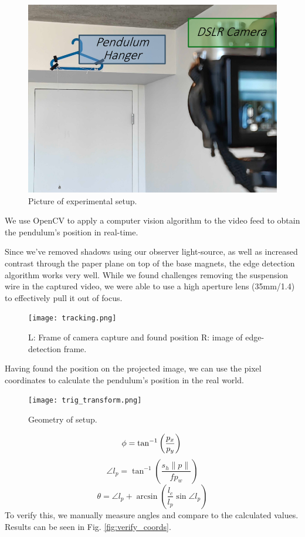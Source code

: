 \documentclass[prl,twocolumn,amsmath,amssymb,superscriptaddress]{revtex4-2}
\begin{document}
\begin{figure}[htb]
    \includegraphics[width=0.66\linewidth]{setup.png}
    \caption{Picture of experimental setup.}
    \label{fig:experiment_setup}
\end{figure}

We use OpenCV to apply a computer vision algorithm to the video feed to obtain the pendulum's position in real-time.

Since we've removed shadows using our observer light-source, as well as increased contrast through the paper plane on top of the base magnets, the edge detection algorithm works very well. While we found challenges removing the suspension wire in the captured video, we were able to use a high aperture lens (35mm/1.4) to effectively pull it out of focus.

\begin{figure}[htb]
    \texttt{[image: tracking.png]}
    \caption{L: Frame of camera capture and found position R: image of edge-detection frame.}
    \label{fig:tracking}
\end{figure}

Having found the position on the projected image, we can use the pixel coordinates to calculate the pendulum's position in the real world.


\begin{figure}[htb]
    \texttt{[image: trig\_transform.png]}
    \caption{Geometry of setup.}
    \label{fig:coordtrans}
    \vspace{-30pt}
\end{figure}


\begin{equation}
    \phi = \tan^{-1} \left(\frac{p_x}{p_y} \right) \\
\end{equation}
\begin{equation}
    \angle l_p = \tan^{-1} \left(\frac{s_h \| p \|}{f p_w} \right)
\end{equation}
\begin{equation}
    \theta = \angle l_p + \arcsin \left(\frac{l_c}{l_p} \sin \angle l_p \right)
\end{equation}
To verify this, we manually measure angles and compare to the calculated values. Results can be seen in Fig. \ref{fig:verify_coords}.
\end{document}
